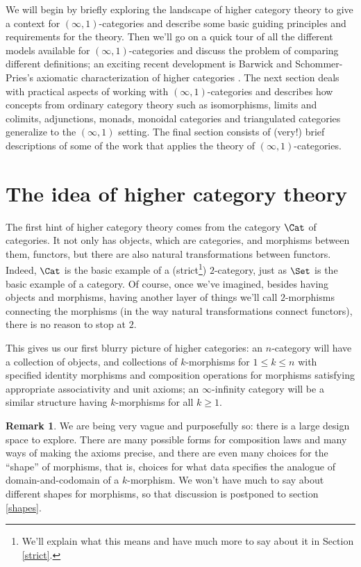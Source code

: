 \documentclass[12pt]{amsart}
\theoremstyle{definition} \newtheorem{definition}[theorem]{Definition}
\newtheorem{remark}[theorem]{Remark}
\numberwithin{equation}{section}
\newcommand{\oo}{\infty}
\newcommand{\io}{$(\oo,1)$}
\begin{document}
We will begin by briefly exploring the landscape of higher category
theory to give a context for \io-categories and describe some basic
guiding principles and requirements for the theory. Then we'll go on a
quick tour of all the different models available for \io-categories
and discuss the problem of comparing different definitions; an
exciting recent development is Barwick and Schommer-Pries's axiomatic
characterization of higher categories \cite{ClarkChris}. The next
section deals with practical aspects of working with \io-categories
and describes how concepts from ordinary category theory such as
isomorphisms, limits and colimits, adjunctions, monads, monoidal
categories and triangulated categories generalize to the \io{}
setting. The final section consists of (very!) brief descriptions
of some of the work that applies the theory of \io-categories.

\section{The idea of higher category theory}

The first hint of higher category theory comes from the category
$\Cat$ of categories. It not only has objects, which are categories,
and morphisms between them, functors, but there are also natural
transformations between functors. Indeed, $\Cat$ is the basic example
of a (strict\footnote{We'll explain what this means and have much more
to say about it in Section \ref{strict}.}) $2$-category, just as
$\Set$ is the basic example of a category. Of course, once we've
imagined, besides having objects and morphisms, having another layer
of things we'll call $2$-morphisms connecting the morphisms (in the
way natural transformations connect functors), there is no reason to
stop at $2$.

This gives us our first blurry picture of higher categories: an
$n$-category will have a collection of objects, and collections of
$k$-morphisms for $1 \le k \le n$ with specified identity morphisms
and composition operations for morphisms satisfying appropriate
associativity and unit axioms; an $\oo$-infinity category will be a
similar structure having $k$-morphisms for all $k \ge 1$.

\begin{remark} We are being very vague and purposefully so: there is a
large design space to explore. There are many possible forms for
composition laws and many ways of making the axioms precise, and there
are even many choices for the ``shape'' of morphisms, that is, choices
for what data specifies the analogue of domain-and-codomain of a
$k$-morphism. We won't have much to say about different shapes for
morphisms, so that discussion is postponed to section \ref{shapes}.
\end{remark}
\end{document}
